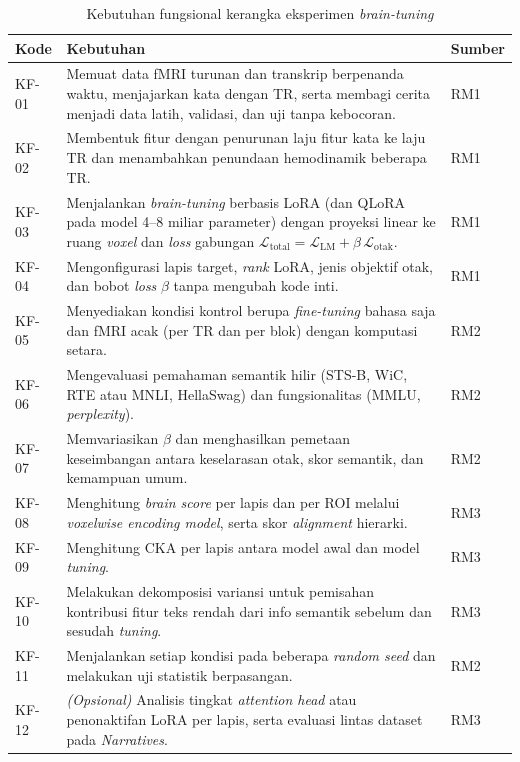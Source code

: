   \begin{table}[h]
    \centering
    \caption{Kebutuhan fungsional kerangka eksperimen \textit{brain-tuning}}
    \label{tab:am_kf}
    \small
    \begin{tabularx}{\textwidth}{p{1.3cm} | X | p{1.5cm}}
      \hline
      \textbf{Kode} & \textbf{Kebutuhan} & \textbf{Sumber} \\
      \hline
      KF-01 & Memuat data fMRI turunan \textcite{lebel2023natural} dan transkrip berpenanda waktu, menjajarkan kata dengan TR, serta membagi cerita menjadi data latih, validasi, dan uji tanpa kebocoran. & RM1 \\
      KF-02 & Membentuk fitur dengan penurunan laju fitur kata ke laju TR dan menambahkan penundaan hemodinamik beberapa TR. & RM1 \\
      KF-03 & Menjalankan \textit{brain-tuning} berbasis LoRA (dan QLoRA pada model 4--8 miliar parameter) dengan proyeksi linear ke ruang \textit{voxel} dan \textit{loss} gabungan $\mathcal{L}_{\text{total}} = \mathcal{L}_{\text{LM}} + \beta\,\mathcal{L}_{\text{otak}}$. & RM1 \\
      KF-04 & Mengonfigurasi lapis target, \textit{rank} LoRA, jenis objektif otak, dan bobot \textit{loss} $\beta$ tanpa mengubah kode inti. & RM1 \\
      KF-05 & Menyediakan kondisi kontrol berupa \textit{fine-tuning} bahasa saja dan fMRI acak (per TR dan per blok) dengan komputasi setara. & RM2 \\
      KF-06 & Mengevaluasi pemahaman semantik hilir (STS-B, WiC, RTE atau MNLI, HellaSwag) dan fungsionalitas (MMLU, \textit{perplexity}). & RM2 \\
      KF-07 & Memvariasikan $\beta$ dan menghasilkan pemetaan keseimbangan antara keselarasan otak, skor semantik, dan kemampuan umum. & RM2 \\
      KF-08 & Menghitung \textit{brain score} per lapis dan per ROI melalui \textit{voxelwise encoding model}, serta skor \textit{alignment} hierarki. & RM3 \\
      KF-09 & Menghitung CKA per lapis antara model awal dan model \textit{tuning}. & RM3 \\
      KF-10 & Melakukan dekomposisi variansi untuk pemisahan kontribusi fitur teks rendah dari info semantik sebelum dan sesudah \textit{tuning}. & RM3 \\
      KF-11 & Menjalankan setiap kondisi pada beberapa \textit{random seed} dan melakukan uji statistik berpasangan. & RM2 \\
      KF-12 & \textit{(Opsional)} Analisis tingkat \textit{attention head} atau penonaktifan LoRA per lapis, serta evaluasi lintas dataset pada \textit{Narratives}. & RM3 \\
      \hline
    \end{tabularx}
  \end{table}